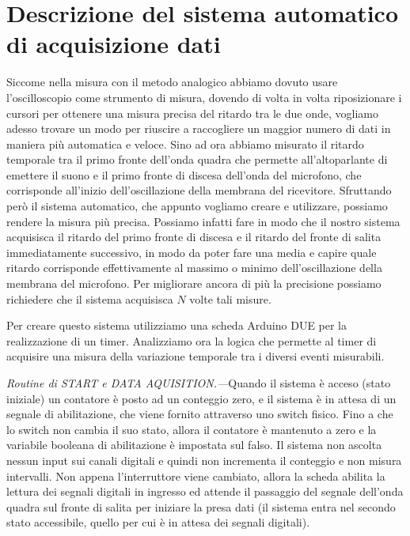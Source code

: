 \documentclass[
    rmp,
    reprint, 
    superscriptaddress, 
    altaffilletter, 
    amsmath, 
    amssymb, 
    a4paper,
    varvw]{revtex4-2}
\begin{document}
\section{Descrizione del sistema automatico di acquisizione dati}
Siccome nella misura con il metodo analogico abbiamo dovuto usare l'oscilloscopio come strumento di misura, dovendo di volta in volta riposizionare i cursori per ottenere una misura precisa del ritardo tra le due onde, vogliamo adesso trovare un modo per riuscire a raccogliere un maggior numero di dati in maniera più automatica e veloce.
Sino ad ora abbiamo misurato il ritardo temporale tra il primo fronte dell'onda quadra che permette all'altoparlante di emettere il suono e il primo fronte di discesa dell'onda del microfono, che corrisponde all'inizio dell'oscillazione della membrana del ricevitore. Sfruttando però il sistema automatico, che appunto vogliamo creare e utilizzare, possiamo rendere la misura più precisa. Possiamo infatti fare in modo che il nostro sistema acquisisca il ritardo del primo fronte di discesa e il ritardo del fronte di salita immediatamente successivo, in modo da poter fare una media e capire quale ritardo corrisponde effettivamente al massimo o minimo dell'oscillazione della membrana del microfono. Per migliorare ancora di più la precisione possiamo richiedere che il sistema acquisisca $N$ volte tali misure.

Per creare questo sistema utilizziamo una scheda Arduino DUE per la realizzazione di un timer.  Analizziamo ora la logica che permette al timer di acquisire una misura della variazione temporale tra i diversi eventi misurabili. 

\textit{Routine di \emph{START} e \emph{DATA AQUISITION}.---}Quando il sistema è acceso (stato iniziale) un contatore è posto ad un conteggio zero, e il sistema è in attesa di un segnale di abilitazione, che viene fornito attraverso uno switch fisico. Fino a che lo switch non cambia il suo stato, allora il contatore è mantenuto a zero e la variabile booleana di abilitazione è impostata sul falso. Il sistema non ascolta nessun input sui canali digitali e quindi non incrementa il conteggio e non misura intervalli. Non appena l'interruttore viene cambiato, allora la scheda abilita la lettura dei segnali digitali in ingresso ed attende il passaggio del segnale dell'onda quadra sul fronte di salita per iniziare la presa dati (il sistema entra nel secondo stato accessibile, quello per cui è in attesa dei segnali digitali).
\end{document}
